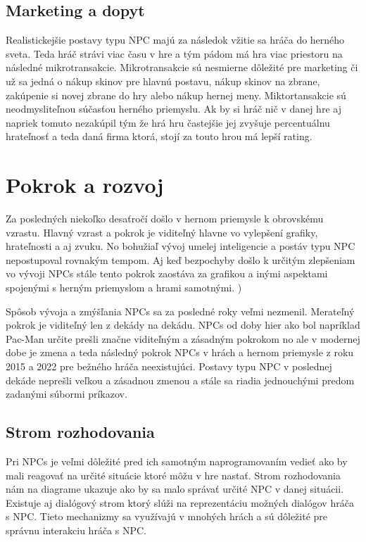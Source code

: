 \documentclass[10pt,twoside,slovak,a4paper]{article}
\begin{document}
\subsection{Marketing a dopyt}
Realistickejšie postavy typu NPC majú za následok vžitie sa hráča do herného sveta. Teda hráč strávi viac času v hre a tým pádom má hra viac priestoru na následné mikrotransakcie. Mikrotransakcie sú nesmierne dôležité pre marketing či už sa jedná o nákup skinov pre hlavnú postavu, nákup skinov na zbrane, zakúpenie si novej zbrane do hry alebo nákup hernej meny. Miktortansakcie sú neodmysliteľnou súčasťou herného priemyslu. 
Ak by si hráč nič v danej hre aj napriek tomuto nezakúpil tým že hrá hru častejšie jej zvyšuje percentuálnu hrateľnosť a teda daná firma ktorá, stojí za touto hrou má lepší rating.



\section{Pokrok a rozvoj}  \label{Rozvoj}

Za posledných niekoľko desaťročí došlo v hernom priemysle k obrovskému vzrastu. Hlavný vzrast a pokrok je viditeľný hlavne vo vylepšení grafiky, hrateľnosti a aj zvuku. No bohužiaľ vývoj umelej inteligencie a postáv typu NPC nepostupoval rovnakým tempom. Aj keď bezpochyby došlo k určitým zlepšeniam vo vývoji NPCs stále tento pokrok zaostáva za grafikou a inými aspektami spojenými s herným priemyslom a hrami samotnými. \cite{phdthesis})

Spôsob vývoja a zmýšľania NPCs sa za posledné roky veľmi nezmenil. Merateľný pokrok je viditeľný len z dekády na dekádu. NPCs od doby hier ako bol napríklad Pac-Man určite prešli značne viditeľným a zásadným pokrokom no ale v modernej dobe je zmena a teda následný pokrok NPCs v hrách a hernom priemysle z roku 2015 a 2022 pre bežného hráča neexistujúci. Postavy typu NPC v poslednej dekáde neprešli veľkou a zásadnou zmenou a stále sa riadia jednouchými predom zadanými súbormi príkazov. \cite{9730383}  

\subsection{Strom rozhodovania}
Pri NPCs je veľmi dôležité pred ich samotným naprogramovaním vedieť ako by mali reagovať na určité situácie ktoré môžu v hre nastať. Strom rozhodovania nám na diagrame ukazuje ako by sa malo správať určité NPC v danej situácii. \cite{9291553} Existuje aj dialógový strom ktorý slúži na reprezentáciu možných dialógov hráča s NPC. Tieto mechanizmy sa využívajú v mnohých hrách a sú dôležité pre správnu interakciu hráča s NPC.
\end{document}

